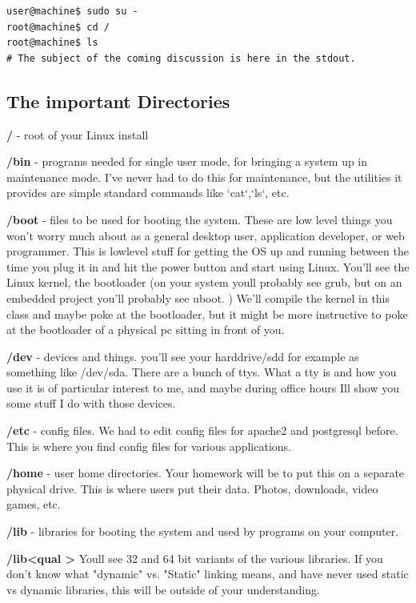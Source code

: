 \documentclass[10pt]{article}
\begin{document}
\begin{lstlisting}
user@machine$ sudo su -
root@machine$ cd / 
root@machine$ ls
# The subject of the coming discussion is here in the stdout.
\end{lstlisting}

\subsection{The important Directories}

{\color{red} \textbf{/}} - root of your Linux install

{\color{red} \textbf{/bin}} - programs needed for single user mode, for bringing
a system up in maintenance mode. I've never had to do this for maintenance, but
the utilities it provides are simple standard commands like `cat`,`ls`, etc.

{\color{red} \textbf{/boot}} - files to be used for booting the system. These
are low level things you won't worry much about as a general desktop user,
application developer, or web programmer. This is lowlevel stuff for getting the
OS up and running between the time you plug it in and hit the power button and
start using Linux. You'll see the Linux kernel, the bootloader (on your system
youll probably see grub, but on an embedded project you'll probably see uboot. )
We'll compile the kernel in this class and maybe poke at the bootloader, but it
might be more instructive to poke at the bootloader of a physical pc sitting in
front of you.

{\color{red} \textbf{/dev}} - devices and things. you'll see your harddrive/sdd
for example as something like /dev/sda. There are a bunch of ttys. What a tty is
and how you use it is of particular interest to me, and maybe during office
hours Ill show you some stuff I do with those devices.

{\color{red} \textbf{/etc}} - config files. We had to edit config files for
apache2 and postgresql before. This is where you find config files for various
applications.

{\color{red} \textbf{/home}} - user home directories. Your homework will be to
put this on a separate physical drive. This is where users put their data.
Photos, downloads, video games, etc.

{\color{red} \textbf{/lib}} - libraries for booting the system and used by
programs on your computer.

{\color{red} \textbf{/lib\textless qual \textgreater}} Youll see 32 and 64 bit
variants of the various libraries. If you don't know what "dynamic" vs. "Static"
linking means, and have never used static vs dynamic libraries, this will be
outside of your understanding.
\end{document}
